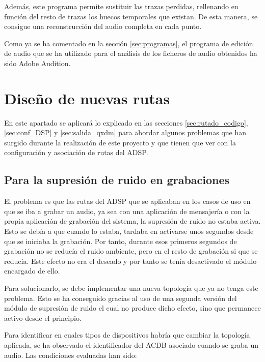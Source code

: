 Además, este programa permite sustituir las trazas perdidas, rellenando en función del resto de trazas los huecos temporales que existan. De esta manera, se consigue una reconstrucción del audio completa en cada punto. 

Como ya se ha comentado en la sección \ref{sec:programas}, el programa de edición de audio que se ha utilizado para el análisis de los ficheros de audio obtenidos ha sido Adobe Audition.

\section{Diseño de nuevas rutas}
En este apartado se aplicará lo explicado en las secciones \ref{sec:rutado_codigo}, \ref{sec:conf_DSP} y \ref{sec:salida_qxdm} para abordar algunos problemas que han surgido durante la realización de este proyecto y que tienen que ver con la configuración y asociación de rutas del \gls{ADSP}. 

\subsection{Para la supresión de ruido en grabaciones}
El problema es que las rutas del \gls{ADSP} que se aplicaban en los casos de uso en que se iba a grabar un audio, ya sea con una aplicación de mensajería o con la propia aplicación de grabación del sistema, la supresión de ruido no estaba activa. Esto se debía a que cuando lo estaba, tardaba en activarse unos segundos desde que se iniciaba la grabación. Por tanto, durante esos primeros segundos de grabación no se reducía el ruido ambiente, pero en el resto de grabación si que se reducía. Este efecto no era el deseado y por tanto se tenía desactivado el módulo encargado de ello.

Para solucionarlo, se debe implementar una nueva topología que ya no tenga este problema. Esto se ha conseguido gracias al uso de una segunda versión del módulo de supresión de ruido el cual no produce dicho efecto, sino que permanece activo desde el principio.

Para identificar en cuales tipos de dispositivos habría que cambiar la topología aplicada, se ha observado el identificador del \gls{ACDB} asociado cuando se graba un audio. Las condiciones evaluadas han sido:

